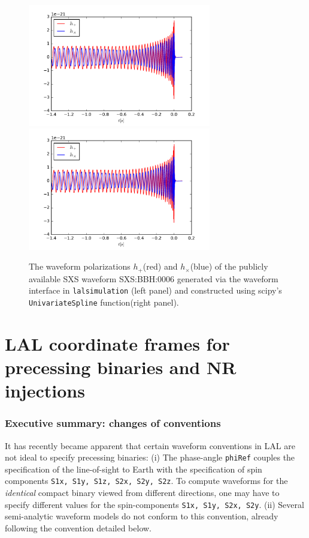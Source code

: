 \documentclass[11pt,tightenlines,article,amssymb,amsmath,amsfonts,superscriptaddress,nofootinbib]{revtex4}
\begin{document}
\begin{figure}
\begin{center}
\includegraphics[width=80mm]{lalsim_SXS6.pdf}
\includegraphics[width=80mm]{pycbc_SXS6.pdf}
\caption{The waveform polarizations $h_+$(red) and $h_\times$(blue) of the publicly available SXS waveform SXS:BBH:0006
generated via the waveform interface in \texttt{lalsimulation} (left panel)
and constructed using scipy's \texttt{UnivariateSpline} function(right panel). }
\label{fig:waveforms}
\end{center}
\end{figure}

\section{LAL coordinate frames for precessing binaries and NR injections}
\label{sec:coordinates}

\subsubsection{Executive summary: changes of conventions}

It has recently became apparent that certain waveform conventions in LAL
are not ideal to specify precessing binaries: (i) The
phase-angle {\tt phiRef} couples the specification of the line-of-sight to
Earth with the specification of spin components {\tt S1x, S1y, S1z, S2x,
S2y, S2z}. To compute waveforms for the \emph{identical} compact binary
viewed from different directions, one may have to specify different
values for the spin-components {\tt S1x, S1y, S2x, S2y}.
(ii) Several semi-analytic waveform models do not conform to this 
convention, already following the convention detailed below.
\end{document}

